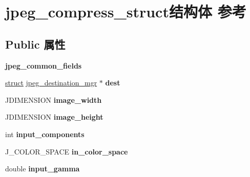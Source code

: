 \hypertarget{structjpeg__compress__struct}{}\section{jpeg\+\_\+compress\+\_\+struct结构体 参考}
\label{structjpeg__compress__struct}
\subsection*{Public 属性}
\begin{DoxyCompactItemize}
\item 
\mbox{\label{structjpeg__compress__struct_a831013770bec36f77dd2048c8771513c}} 
{\bfseries jpeg\+\_\+common\+\_\+fields}
\item 
\mbox{\label{structjpeg__compress__struct_ab31c2c756e309dee8d0318557353ba40}} 
\hyperlink{interfacestruct}{struct} \hyperlink{structjpeg__destination__mgr}{jpeg\+\_\+destination\+\_\+mgr} $\ast$ {\bfseries dest}
\item 
\mbox{\label{structjpeg__compress__struct_ac8e50a2c70252c53f3e10b886818f2cf}} 
J\+D\+I\+M\+E\+N\+S\+I\+ON {\bfseries image\+\_\+width}
\item 
\mbox{\label{structjpeg__compress__struct_a30863835e7785b7df800811f842b2da0}} 
J\+D\+I\+M\+E\+N\+S\+I\+ON {\bfseries image\+\_\+height}
\item 
\mbox{\label{structjpeg__compress__struct_af5b66b039ea5a96bb2f5cf0254115837}} 
int {\bfseries input\+\_\+components}
\item 
\mbox{\label{structjpeg__compress__struct_ac27d1dfbbbd677aab9fb570c58ca960d}} 
J\+\_\+\+C\+O\+L\+O\+R\+\_\+\+S\+P\+A\+CE {\bfseries in\+\_\+color\+\_\+space}
\item 
\mbox{\label{structjpeg__compress__struct_ac5d2e16382ea12fb4e3bd6a69f7831ea}} 
double {\bfseries input\+\_\+gamma}
\item 
\mbox{\label{structjpeg__compress__struct_a16eb7e2e1ac30c42e8bd753bde43129c}} 

\end{DoxyCompactItemize}
